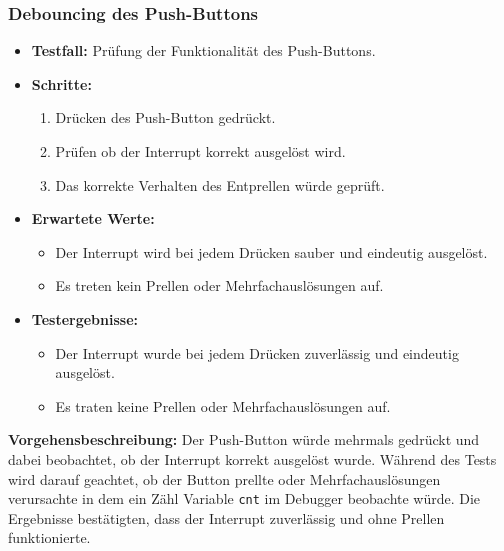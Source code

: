 \subsubsection{Debouncing des Push-Buttons}
\begin{itemize}
	\item \textbf{Testfall:} Prüfung der Funktionalität des Push-Buttons.
	\item \textbf{Schritte:}
	\begin{enumerate}
		\item Drücken des Push-Button gedrückt.
		\item Prüfen ob der Interrupt korrekt ausgelöst wird.
		\item Das korrekte Verhalten des Entprellen würde geprüft.
	\end{enumerate}
	\item \textbf{Erwartete Werte:}
	\begin{itemize}
		\item Der Interrupt wird bei jedem Drücken sauber und eindeutig ausgelöst.
		\item Es treten kein Prellen oder Mehrfachauslösungen auf.
	\end{itemize}
	\item \textbf{Testergebnisse:}
	\begin{itemize}
		\item Der Interrupt wurde bei jedem Drücken zuverlässig und eindeutig ausgelöst.
		\item Es traten keine Prellen oder Mehrfachauslösungen auf.
	\end{itemize}
\end{itemize}


\textbf{Vorgehensbeschreibung:}
Der Push-Button würde mehrmals gedrückt und dabei beobachtet, ob der Interrupt korrekt ausgelöst wurde. Während des Tests wird darauf geachtet, ob der Button prellte oder Mehrfachauslösungen verursachte in dem ein Zähl Variable \texttt{cnt} im Debugger beobachte würde. Die Ergebnisse bestätigten, dass der Interrupt zuverlässig und ohne Prellen funktionierte.

